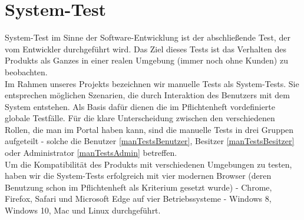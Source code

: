 \documentclass[parskip=full,11pt]{scrartcl}
\begin{document}
\newpage
\section{System-Test} \label{systemtest}
System-Test im Sinne der Software-Entwicklung ist der abschließende Test, der vom Entwickler durchgeführt wird. Das Ziel dieses Tests ist das Verhalten des Produkts als Ganzes in einer realen Umgebung (immer noch ohne Kunden) zu beobachten.\\
Im Rahmen unseres Projekts bezeichnen wir manuelle Tests als System-Tests. Sie entsprechen möglichen Szenarien, die durch Interaktion des Benutzers mit dem System entstehen. Als Basis dafür dienen die im Pflichtenheft vordefinierte globale Testfälle. Für die klare Unterscheidung zwischen den verschiedenen Rollen, die man im Portal haben kann, sind die manuelle Tests in drei Gruppen aufgeteilt - solche die Benutzer \ref{manTestsBenutzer}, Besitzer \ref{manTestsBesitzer} oder Administrator \ref{manTestsAdmin} betreffen.\\
Um die Kompatibilität des Produkts mit verschiedenen Umgebungen zu testen, haben wir die System-Tests erfolgreich mit vier modernen Browser (deren Benutzung schon im Pflichtenheft als Kriterium gesetzt wurde) - Chrome, Firefox, Safari und Microsoft Edge auf vier Betriebssysteme - Windows 8, Windows 10, Mac und Linux durchgeführt.  
\end{document}
